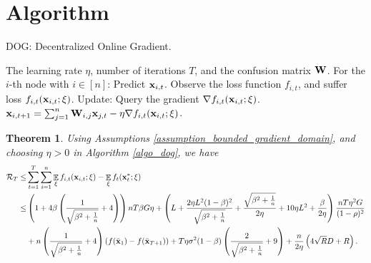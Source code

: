 \documentclass{article}
\newtheorem{Theorem}{\bf{Theorem}}
\begin{document}
\section{Algorithm}


\newcommand\StateX{\Statex\hspace{\algorithmicindent}}
\begin{algorithm}[!]
   \caption{DOG: Decentralized Online Gradient.}
   \label{algo_dog}
   \begin{algorithmic}[1]
   \Require The learning rate $\eta$, number of iterations $T$, and the confusion matrix ${\bf W}$.
           \StateX For the $i$-th node with $i\in[n]$:
            \State \indent Predict ${\bf x}_{i,t}$.
            \State \indent Observe the loss function $f_{i,t}$,
            \StateX \indent and suffer loss $f_{i,t}({\bf x}_{i,t};\xi)$.
            \StateX Update:
            \State \indent Query the gradient $\nabla f_{i,t}({\bf x}_{i,t};\xi)$.  
            \State \indent ${\bf x}_{i,t+1} = \sum_{j=1}^n {\bf W}_{i,j}{\bf x}_{j,t} - \eta \nabla f_{i,t}({\bf x}_{i,t};\xi)$. 
       \EndFor
   \end{algorithmic}
\end{algorithm}










\begin{Theorem}
\label{theorem_regret_upper_bound}
Using Assumptions \ref{assumption_bounded_gradient_domain}, and choosing $\eta>0$ in Algorithm \ref{algo_dog}, we have
\begin{align}
\nonumber
{\mathcal{R}}_T \le &  \sum_{t=1}^T\sum_{i=1}^n \mathop{\mathbb{E}}_{\xi}f_{i,t}({\bf x}_{i,t};\xi) - \mathop{\mathbb{E}}_{\xi}f_t({\bf x}_t^\ast;\xi) \\ \nonumber
\le & \left( 1 + 4\beta\left( \frac{1}{\sqrt{\beta^2 + \frac{1}{n}}}+4 \right) \right)nT\beta G \eta + \left(  L + \frac{2\eta L^2(1-\beta)^2}{\sqrt{\beta^2 + \frac{1}{n}}} + \frac{\sqrt{\beta^2 + \frac{1}{n}}}{2\eta} + 10\eta L^2  + \frac{\beta}{2\eta}  \right) \frac{nT \eta^2 G}{(1-\rho)^2} \\ \nonumber 
&+ n\left( \frac{1}{\sqrt{\beta^2 + \frac{1}{n}}} + 4 \right)\left( f(\bar{{\bf x}}_1) - f(\bar{{\bf x}}_{T+1}) \right) + T\eta \sigma^2 (1-\beta)\left( \frac{2}{\sqrt{\beta^2 + \frac{1}{n}}}+9 \right)   + \frac{n}{2\eta}\left(  4\sqrt{R}D + R   \right).
\end{align}


\end{Theorem}
\end{document}
